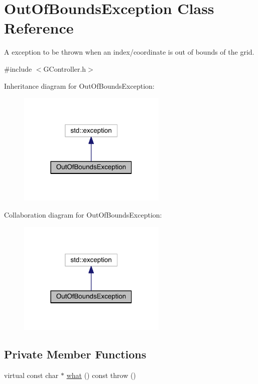 \hypertarget{classOutOfBoundsException}{\section{Out\+Of\+Bounds\+Exception Class Reference}
\label{classOutOfBoundsException}
}


A exception to be thrown when an index/coordinate is out of bounds of the grid.  




{\ttfamily \#include $<$G\+Controller.\+h$>$}



Inheritance diagram for Out\+Of\+Bounds\+Exception\+:\nopagebreak
\begin{figure}[H]
\begin{center}
\leavevmode
\includegraphics[width=201pt]{classOutOfBoundsException__inherit__graph}
\end{center}
\end{figure}


Collaboration diagram for Out\+Of\+Bounds\+Exception\+:\nopagebreak
\begin{figure}[H]
\begin{center}
\leavevmode
\includegraphics[width=201pt]{classOutOfBoundsException__coll__graph}
\end{center}
\end{figure}
\subsection*{Private Member Functions}
\begin{DoxyCompactItemize}
\item 
virtual const char $\ast$ \hyperlink{classOutOfBoundsException_ad4f79bd670244696d3a7208d8ed51f34}{what} () const   throw ()
\end{DoxyCompactItemize}


